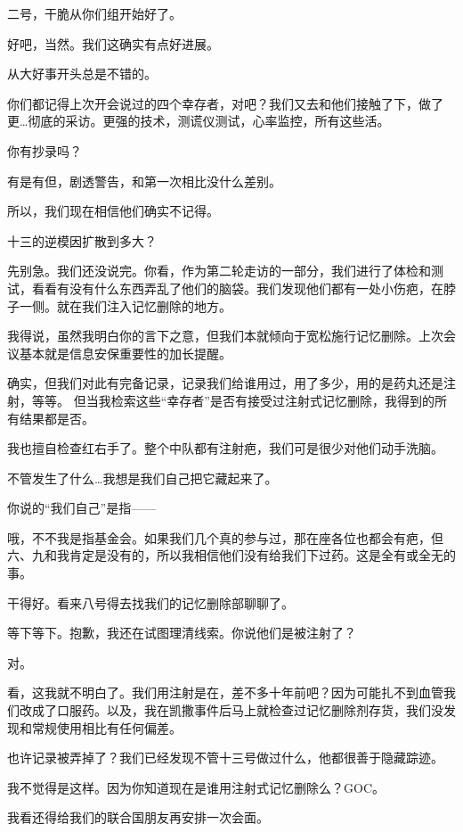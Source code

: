 \begin{scpbox}


二号，干脆从你们组开始好了。

好吧，当然。我们这确实有点好进展。

从大好事开头总是不错的。

你们都记得上次开会说过的四个幸存者，对吧？我们又去和他们接触了下，做了更…彻底的采访。更强的技术，测谎仪测试，心率监控，所有这些活。

你有抄录吗？

有是有但，剧透警告，和第一次相比没什么差别。

所以，我们现在相信他们确实不记得。

十三的逆模因扩散到多大？

先别急。我们还没说完。你看，作为第二轮走访的一部分，我们进行了体检和测试，看看有没有什么东西弄乱了他们的脑袋。我们发现他们都有一处小伤疤，在脖子一侧。就在我们注入记忆删除的地方。

我得说，虽然我明白你的言下之意，但我们本就倾向于宽松施行记忆删除。上次会议基本就是信息安保重要性的加长提醒。

确实，但我们对此有完备记录，记录我们给谁用过，用了多少，用的是药丸还是注射，等等。 但当我检索这些“幸存者”是否有接受过注射式记忆删除，我得到的所有结果都是否。

我也擅自检查红右手了。整个中队都有注射疤，我们可是很少对他们动手洗脑。

不管发生了什么…我想是我们自己把它藏起来了。

你说的“我们自己”是指——

哦，不不我是指基金会。如果我们几个真的参与过，那在座各位也都会有疤，但六、九和我肯定是没有的，所以我相信他们没有给我们下过药。这是全有或全无的事。

干得好。看来八号得去找我们的记忆删除部聊聊了。

等下等下。抱歉，我还在试图理清线索。你说他们是被注射了？

对。

看，这我就不明白了。我们用注射是在，差不多十年前吧？因为可能扎不到血管我们改成了口服药。以及，我在凯撒事件后马上就检查过记忆删除剂存货，我们没发现和常规使用相比有任何偏差。

也许记录被弄掉了？我们已经发现不管十三号做过什么，他都很善于隐藏踪迹。

我不觉得是这样。因为你知道现在是谁用注射式记忆删除么？GOC。

我看还得给我们的联合国朋友再安排一次会面。

\end{scpbox}

